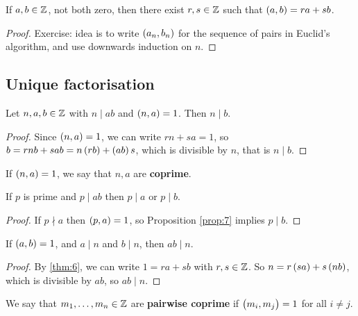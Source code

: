 \begin{theorem}
\label{thm:6}
If $ a, b \in \mathbb{Z} $, not both zero, then there exist $ r, s \in \mathbb{Z} $ such that $ \br{a, b} = ra + sb $.
\end{theorem}

\begin{proof}
Exercise: idea is to write $ \br{a_n, b_n} $ for the sequence of pairs in Euclid's algorithm, and use downwards induction on $ n $.
\end{proof}

\pagebreak

\subsection{Unique factorisation}

\begin{proposition}
\label{prop:7}
Let $ n, a, b \in \mathbb{Z} $ with $ n \mid ab $ and $ \br{n, a} = 1 $. Then $ n \mid b $.
\end{proposition}

\begin{proof}
Since $ \br{n, a} = 1 $, we can write $ rn + sa = 1 $, so $ b = rnb + sab = n\br{rb} + \br{ab}s $, which is divisible by $ n $, that is $ n \mid b $.
\end{proof}

If $ \br{n, a} = 1 $, we say that $ n, a $ are \textbf{coprime}.


\begin{corollary}
\label{cor:8}
If $ p $ is prime and $ p \mid ab $ then $ p \mid a $ or $ p \mid b $.
\end{corollary}

\begin{proof}
If $ p \nmid a $ then $ \br{p, a} = 1 $, so Proposition \ref{prop:7} implies $ p \mid b $.
\end{proof}

\begin{proposition}
\label{prop:9}
If $ \br{a, b} = 1 $, and $ a \mid n $ and $ b \mid n $, then $ ab \mid n $.
\end{proposition}

\begin{proof}
By \ref{thm:6}, we can write $ 1 = ra + sb $ with $ r, s \in \mathbb{Z} $. So $ n = r\br{sa} + s\br{nb} $, which is divisible by $ ab $, so $ ab \mid n $.
\end{proof}

We say that $ m_1, \dots, m_n \in \mathbb{Z} $ are \textbf{pairwise coprime} if $ \br{m_i, m_j} = 1 $ for all $ i \ne j $.

